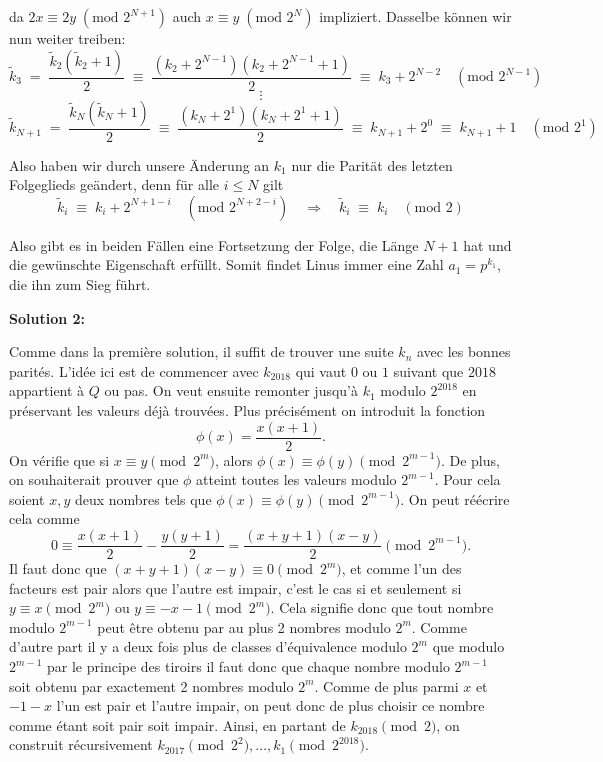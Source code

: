 \documentclass[language=german,style=solution]{smo}
\begin{document}
\begin{enumerate}
da $2x \equiv 2y \; (\text{mod } 2^{N+1})$ auch $x \equiv y \; (\text{mod } 2^N)$ impliziert. Dasselbe können wir nun weiter treiben:
\[
\tilde k_3 \; = \; \frac{\tilde k_2( \tilde k_2 + 1)}{2} \; \equiv \; \frac{(k_2+2^{N-1})(k_2+2^{N-1}+1)}{2} \; \equiv \; k_3 + 2^{N-2} \quad (\text{mod } 2^{N-1})
\] \[
\vdots
\] \[
\tilde k_{N+1} \; = \; \frac{\tilde k_{N}( \tilde k_N + 1)}{2} \; \equiv \; \frac{(k_N+2^1)(k_N+2^1+1)}{2} \; \equiv \; k_{N+1} + 2^0 \; \equiv \; k_{N+1} + 1 \quad (\text{mod } 2^1)
\]

Also haben wir durch unsere Änderung an $k_1$ nur die Parität des letzten Folgeglieds geändert, denn für alle $i \leq N$ gilt
\[
\tilde k_i \; \equiv \; k_i + 2^{N+1-i} \quad (\text{mod } 2^{N+2-i}) \quad \Rightarrow \quad \tilde k_i \; \equiv \; k_i \quad (\text{mod } 2)
\]

Also gibt es in beiden Fällen eine Fortsetzung der Folge, die Länge $N+1$ hat und die gewünschte Eigenschaft erfüllt. Somit findet Linus immer eine Zahl $a_1 = p^{k_1}$, die ihn zum Sieg führt.

\textbf{Solution 2:}

Comme dans la première solution, il suffit de trouver une suite $k_n$ avec les bonnes parités. L'idée ici est de commencer avec $k_{2018}$ qui vaut $0$ ou $1$ suivant que $2018$ appartient à $Q$ ou pas. On veut ensuite remonter jusqu'à $k_1$ modulo $2^{2018}$ en préservant les valeurs déjà trouvées. Plus précisément on introduit la fonction 
\[
	\phi(x) = \frac{x(x+1)}{2}.
\]
On vérifie que si $x\equiv y \pmod{2^m}$, alors $\phi(x)\equiv \phi(y) \pmod{2^{m-1}}$. De plus, on souhaiterait prouver que $\phi$ atteint toutes les valeurs modulo $2^{m-1}$. Pour cela soient $x, y$ deux nombres tels que $\phi(x)\equiv \phi(y) \pmod{2^{m-1}}$. On peut réécrire cela comme
\[
	0 \equiv \frac{x(x+1)}{2} - \frac{y(y+1)}{2} = \frac{(x+y+1)(x-y)}{2} \pmod{2^{m-1}}.
\]
Il faut donc que $(x+y+1)(x-y) \equiv 0 \pmod{2^m}$, et comme l'un des facteurs est pair alors que l'autre est impair, c'est le cas si et seulement si $y\equiv x \pmod{2^m}$ ou $y \equiv -x-1 \pmod{2^m}$. Cela signifie donc que tout nombre modulo $2^{m-1}$ peut être obtenu par au plus 2 nombres modulo $2^m$. Comme d'autre part il y a deux fois plus de classes d'équivalence modulo $2^m$ que modulo $2^{m-1}$ par le principe des tiroirs il faut donc que chaque nombre modulo $2^{m-1}$ soit obtenu par exactement 2 nombres modulo $2^m$. Comme de plus parmi $x$ et $-1-x$ l'un est pair et l'autre impair, on peut donc de plus choisir ce nombre comme étant soit pair soit impair. Ainsi, en partant de $k_{2018} \pmod{2}$, on construit récursivement $k_{2017} \pmod{2^2}, \ldots, k_1 \pmod{2^{2018}}$.


\end{enumerate}
\end{document}
